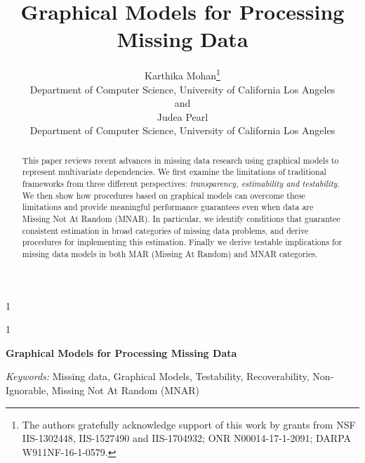 \documentclass[12pt]{article}
\newcommand{\blind}{1}
\begin{document}
%

\def\spacingset#1{\renewcommand{\baselinestretch}%
{#1}\small\normalsize} \spacingset{1}



\blind
{
  \title{\bf Graphical Models for Processing Missing Data}
  \author{Karthika Mohan\thanks{
    The authors gratefully acknowledge support of this work by grants from
    NSF IIS-1302448, IIS-1527490 and IIS-1704932; ONR N00014-17-1-2091;
    DARPA W911NF-16-1-0579.}\hspace{.2cm}\\
    Department of Computer Science, University of California Los Angeles\\
    and \\
    Judea Pearl \\
		Department of Computer Science, University of California Los Angeles}
  \maketitle
} \fi

\blind
{
  \bigskip
  \begin{center}\texttt{}
    {\LARGE\bf Graphical Models for Processing Missing Data}
\end{center}
  \medskip
} \fi

\bigskip
\begin{abstract}
This paper reviews recent advances in missing data
research using graphical models to represent multivariate
dependencies. We first examine the limitations of traditional
frameworks from three different perspectives:
\textit{transparency, estimability and testability}.
We then show how procedures based on graphical
models can overcome these limitations and provide
meaningful performance guarantees even when data are
Missing Not At Random (MNAR). In particular, we identify
conditions that guarantee consistent estimation in broad categories of missing data problems,
and derive procedures for implementing this estimation.
Finally we derive testable implications for missing data 
models in both  MAR (Missing At Random) and MNAR categories.
\end{abstract}

\noindent%
{\it Keywords:} Missing data, Graphical Models, Testability, Recoverability, Non-Ignorable, Missing Not At Random (MNAR) 
\vfill

\newpage
\end{document}
